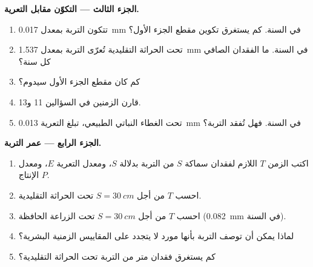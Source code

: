 \begin{problem}
\medskip
\noindent\textbf{الجزء الثالث --- التكوّن مقابل التعرية.}
\begin{enumerate}[resume]
  \item تتكون التربة بمعدل \qty{0.017}{mm} في السنة. كم يستغرق تكوين
        مقطع الجزء الأول؟
  \item تحت الحراثة التقليدية تُعرّى التربة بمعدل \qty{1.537}{mm} في
        السنة. ما الفقدان الصافي كل سنة؟
  \item كم كان مقطع الجزء الأول سيدوم؟
  \item قارن الزمنين في السؤالين 11 و13.
  \item تحت الغطاء النباتي الطبيعي، تبلغ التعرية \qty{0.013}{mm} في السنة. فهل
        تُفقد التربة؟
\end{enumerate}

\medskip
\noindent\textbf{الجزء الرابع --- عمر التربة.}
\begin{enumerate}[resume]
  \item اكتب الزمن $T$ اللازم لفقدان سماكة $S$ من التربة بدلالة
        $S$، ومعدل التعرية $E$، ومعدل الإنتاج $P$.
  \item احسب $T$ من أجل $S = \qty{30}{cm}$ تحت الحراثة التقليدية.
  \item احسب $T$ من أجل $S = \qty{30}{cm}$ تحت الزراعة الحافظة
        (\qty{0.082}{mm} في السنة).
  \item لماذا يمكن أن توصف التربة بأنها مورد لا يتجدد على المقاييس الزمنية
        البشرية؟
  \item كم يستغرق فقدان متر من التربة تحت الحراثة
        التقليدية؟
\end{enumerate}
\end{problem}
